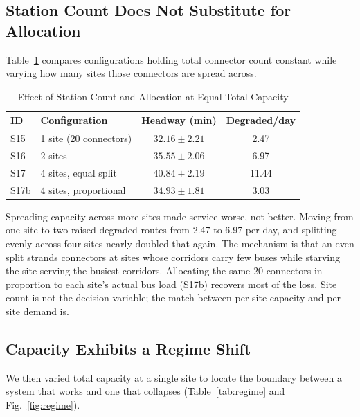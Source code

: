 \documentclass[conference]{IEEEtran}
\begin{document}
\subsection{Station Count Does Not Substitute for Allocation}

Table~\ref{tab:locations} compares configurations holding total connector
count constant while varying how many sites those connectors are spread
across.

\begin{table}[htbp]
\caption{Effect of Station Count and Allocation at Equal Total Capacity}
\begin{center}
\begin{tabular}{llcc}
\toprule
\textbf{ID} & \textbf{Configuration} & \textbf{Headway (min)} &
\textbf{Degraded/day} \\
\midrule
S15 & 1 site (20 connectors) & $32.16 \pm 2.21$ & 2.47 \\
S16 & 2 sites & $35.55 \pm 2.06$ & 6.97 \\
S17 & 4 sites, equal split & $40.84 \pm 2.19$ & 11.44 \\
S17b & 4 sites, proportional & $34.93 \pm 1.81$ & 3.03 \\
\bottomrule
\end{tabular}
\label{tab:locations}
\end{center}
\end{table}

Spreading capacity across more sites made service worse, not better.
Moving from one site to two raised degraded routes from 2.47 to 6.97 per
day, and splitting evenly across four sites nearly doubled that again.
The mechanism is that an even split strands connectors at sites whose
corridors carry few buses while starving the site serving the busiest
corridors. Allocating the same 20 connectors in proportion to each site's
actual bus load (S17b) recovers most of the loss. Site count is not the
decision variable; the match between per-site capacity and per-site
demand is.

\subsection{Capacity Exhibits a Regime Shift}

We then varied total capacity at a single site to locate the boundary
between a system that works and one that collapses
(Table~\ref{tab:regime} and Fig.~\ref{fig:regime}).
\end{document}
